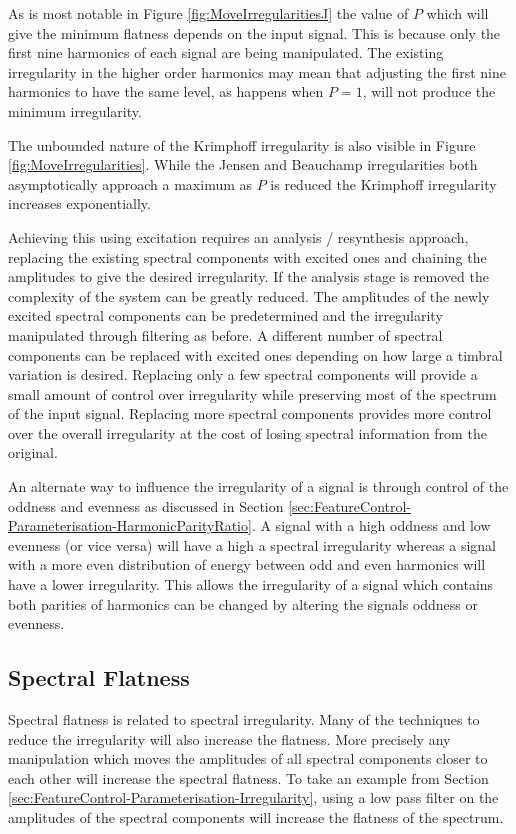 		As is most notable in Figure \ref{fig:MoveIrregularitiesJ} the value of $P$ which will give the minimum
		flatness depends on the input signal. This is because only the first nine harmonics of each signal are
		being manipulated. The existing irregularity in the higher order harmonics may mean that adjusting the
		first nine harmonics to have the same level, as happens when $P = 1$, will not produce the minimum
		irregularity.

		The unbounded nature of the Krimphoff irregularity is also visible in Figure \ref{fig:MoveIrregularities}.
		While the Jensen and Beauchamp irregularities both asymptotically approach a maximum as $P$ is reduced the
		Krimphoff irregularity increases exponentially.

		Achieving this using excitation requires an analysis / resynthesis approach, replacing the existing
		spectral components with excited ones and chaining the amplitudes to give the desired irregularity.  If the
		analysis stage is removed the complexity of the system can be greatly reduced. The amplitudes of the newly
		excited spectral components can be predetermined and the irregularity manipulated through filtering as
		before. A different number of spectral components can be replaced with excited ones depending on how large
		a timbral variation is desired. Replacing only a few spectral components will provide a small amount of
		control over irregularity while preserving most of the spectrum of the input signal. Replacing more
		spectral components provides more control over the overall irregularity at the cost of losing spectral
		information from the original.

		An alternate way to influence the irregularity of a signal is through control of the oddness and evenness
		as discussed in Section \ref{sec:FeatureControl-Parameterisation-HarmonicParityRatio}. A signal with a high
		oddness and low evenness (or vice versa) will have a high a spectral irregularity whereas a signal with a
		more even distribution of energy between odd and even harmonics will have a lower irregularity. This allows
		the irregularity of a signal which contains both parities of harmonics can be changed by altering the
		signals oddness or evenness.

	\subsection{Spectral Flatness}
	\label{sec:FeatureControl-Parameterisation-Flatness}
		Spectral flatness is related to spectral irregularity. Many of the techniques to reduce the irregularity
		will also increase the flatness. More precisely any manipulation which moves the amplitudes of all spectral
		components closer to each other will increase the spectral flatness. To take an example from Section
		\ref{sec:FeatureControl-Parameterisation-Irregularity}, using a low pass filter on the amplitudes of the
		spectral components will increase the flatness of the spectrum.

